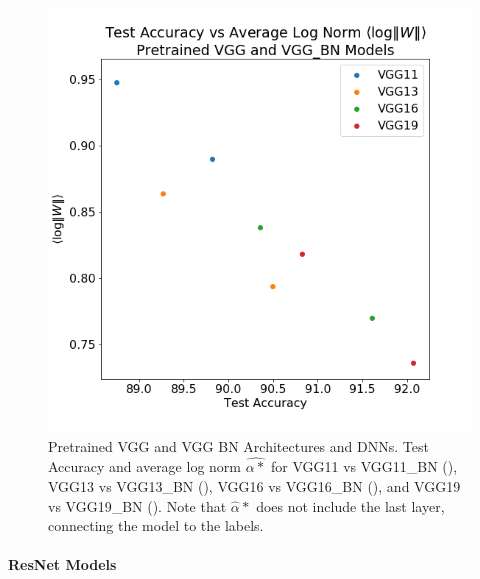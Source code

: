 \begin{figure}[!htb]
 \centering
   \includegraphics[scale=0.40]{img/vgg-lognorms.png}
   \caption{
Pretrained VGG and VGG BN Architectures and DNNs.  Test Accuracy and average log norm $\hat{\alpha*}$ for
 VGG11 vs VGG11\_BN ({\color{blue}{blue}}),
VGG13 vs VGG13\_BN ({\color{orange}{orange}}),
VGG16 vs VGG16\_BN ({\color{green}{green}}),  and
VGG19 vs VGG19\_BN ({\color{red}{red}}). 
Note that $\hat{\alpha}*$ does not include the last layer, connecting the model to the labels.
}
  \label{fig:vgg}
\end{figure}


\paragraph{ResNet Models}

